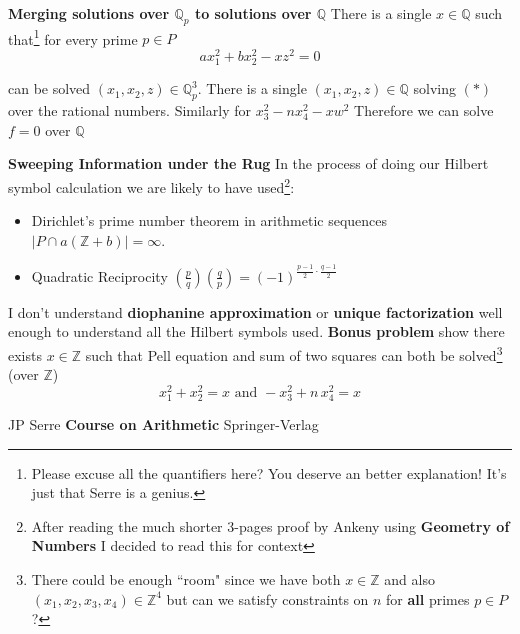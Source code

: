 \documentclass[12pt]{article}
\begin{document}
\newpage

\noindent\textbf{Merging solutions over $\mathbb{Q}_p$ to solutions over $\mathbb{Q}$  }
\newline \newline
\noindent There is a single $x \in \mathbb{Q}$ such that\footnote{Please excuse all the quantifiers here? You deserve an better explanation!  It's just that Serre is a genius.} for every prime $p \in P$
$$a x_1^2 + b x_2^2 - x z^2 = 0 $$ 

\noindent can be solved $(x_1, x_2, z) \in \mathbb{Q}_p^3$.  There is a single $(x_1, x_2, z) \in \mathbb{Q}$ 
\newline \newline
solving $(\ast)$ over the rational numbers.  Similarly for $x_3^2 - n x_4^2 - x w^2$
\newline \newline
Therefore we can solve $f = 0$ over $\mathbb{Q}$

\newpage

\noindent\textbf{Sweeping Information under the Rug  }
\newline \newline
In the process of doing our Hilbert symbol calculation we are likely to have used\footnote{After reading the much shorter 3-pages proof by Ankeny using \textbf{Geometry of Numbers} I decided to read this for context}:
\begin{itemize}
\item Dirichlet's prime number theorem in arithmetic sequences $|P \cap a (\mathbb{Z} + b)|=\infty$.
\item Quadratic Reciprocity \hspace{0.75in}$(\frac{p}{q})(\frac{q}{p}) = (-1)^{\frac{p-1}{2}\cdot\frac{q-1}{2}}$
\end{itemize} \vspace{12pt}
I don't understand \textbf{diophanine approximation} or \textbf{unique factorization} well enough to understand all the Hilbert symbols used. 
\newline \newline
\textbf{Bonus problem} show there exists $x \in \mathbb{Z}$ such that Pell equation and sum of two squares can both be solved\footnote{There could be enough ``room" since we have both $x \in \mathbb{Z}$ and also $(x_1, x_2, x_3, x_4)\in \mathbb{Z}^4$ but can we satisfy constraints on $n$ for \textbf{all} primes $p \in P$ ?} (over $\mathbb{Z}$)
$$ x_1^2 + x_2^2 = x \text{ and } -x_3^2 + n \, x_4^2 = x $$

\newpage
{}\selectfont \fontsize{12}{10}\selectfont

\begin{thebibliography}{}

\item JP Serre \textbf{Course on Arithmetic} Springer-Verlag



\end{thebibliography}
\end{document}
